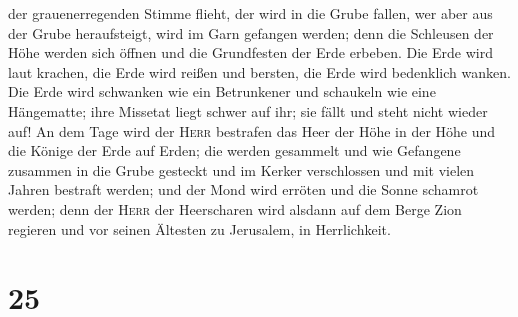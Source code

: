 der grauenerregenden Stimme flieht, der wird in die Grube fallen, wer
aber aus der Grube heraufsteigt, wird im Garn gefangen werden; denn die
Schleusen der Höhe werden sich öffnen und die Grundfesten der Erde
erbeben.  Die Erde wird laut krachen, die Erde wird
reißen und bersten, die Erde wird bedenklich wanken.  Die
Erde wird schwanken wie ein Betrunkener und schaukeln wie eine
Hängematte; ihre Missetat liegt schwer auf ihr; sie fällt und steht
nicht wieder auf!  An dem Tage wird der \textsc{Herr}
bestrafen das Heer der Höhe in der Höhe und die Könige der Erde auf
Erden;  die werden gesammelt und wie Gefangene zusammen
in die Grube gesteckt und im Kerker verschlossen und mit vielen Jahren
bestraft werden;  und der Mond wird erröten und die Sonne
schamrot werden; denn der \textsc{Herr} der Heerscharen wird alsdann auf
dem Berge Zion regieren und vor seinen Ältesten zu Jerusalem, in
Herrlichkeit.

\hypertarget{section-24}{%
\section{25}\label{section-24}}

